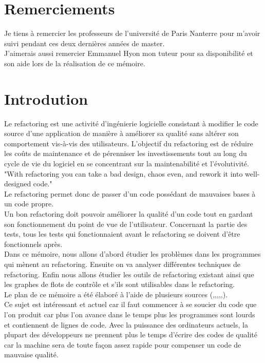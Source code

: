 \documentclass[a4paper,twoside,12pt,openright]{report}
\begin{document}
\section{Remerciements}
Je tiens à remercier les professeurs de l'université de Paris Nanterre pour m'avoir suivi pendant ces deux dernières années de master.\\
J'aimerais aussi remercier Emmanuel Hyon mon tuteur pour sa disponibilité et son aide lors de la réalisation de ce mémoire.\\


\section{Introdution}
Le refactoring est une activité d'ingénierie logicielle consistant à modifier le code source d'une application de manière à améliorer sa qualité sans altérer son comportement vis-à-vis des utilisateurs.
L'objectif du refactoring est de réduire les coûts de maintenance et de pérenniser les investissements tout au long du cycle de vie du logiciel en se concentrant sur la maintenabilité et l'évolutivité.\cite{ref1}\\
"With refactoring you can take a bad design, chaos even, and rework it into well-designed code."\cite{ref2}\\
Le refactoring permet donc de passer d'un code possédant de mauvaises bases à un code propre.\\
Un bon refactoring doit pouvoir améliorer la qualité d'un code tout en gardant son fonctionnement du point de vue de l'utilisateur. Concernant la partie des tests, tous les tests qui fonctionnaient avant le refactoring se doivent d'être fonctionnels après.\\
Dans ce mémoire, nous allons d'abord étudier les problèmes dans les programmes qui mènent au refactoring. Ensuite on va analyser différentes techniques de refactoring. Enfin nous allons étudier les outils de refactoring existant ainsi que les graphes de flots de contrôle et s'ils sont utilisables dans le refactoring.\\
Le plan de ce mémoire a été élaboré à l'aide de plusieurs sources (\cite{ref3},\cite{ref4},\cite{ref5},\cite{ref8},\cite{ref14},\cite{ref7}).\\
Ce sujet est intéressant et actuel car il faut commencer à se soucier du code que l'on produit car plus l'on avance dans le temps plus les programmes sont lourds et contiennent de lignes de code. Avec la puissance des ordinateurs actuels, la plupart des développeurs ne prennent plus le temps d'écrire des codes de qualité car la machine sera de toute façon assez rapide pour compenser un code de mauvaise qualité.\cite{ref4}\\
\end{document}
